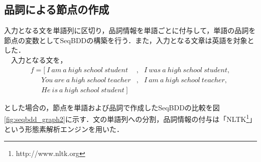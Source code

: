 \documentclass[12pt,twoside, fleqn]{ujbook}
\begin{document}
	
	\subsection{品詞による節点の作成}
	\label{text:seq_with_parts}
	入力となる文を単語列に区切り，品詞情報を単語ごとに付与して，単語の品詞を節点の変数としてSeqBDDの構築を行う．また，入力となる文章は英語を対象とした．\\
	　入力となる文を，
	\begin{eqnarray*}
	f=[\ I\ am\ a\ high\ school\ student&,& I\ was\ a\ high\ school\ student,\\
	\ \ \ \ \ \ \ You\ are\ a\ high\ school\ teacher&,& I\ am\ a\ high\ school\ teacher,\\
	\ \ \ \ \ \ \ He\ is\ a\ high\ school\ student\ ]&&
	\end{eqnarray*}

	とした場合の，節点を単語および品詞で作成したSeqBDDの比較を図\ref{fig:seqbdd_graph2}に示す．文の単語列への分割，品詞情報の付与は「NLTK\footnote{http://www.nltk.org}」という形態素解析エンジンを用いた．
\end{document}
